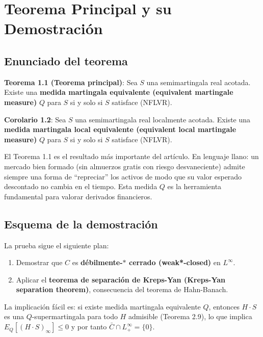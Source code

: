 \documentclass[12pt]{article}
\begin{document}
\section{Teorema Principal y su Demostraci\'on}

\subsection{Enunciado del teorema}

\textbf{Teorema 1.1 (Teorema principal)}: Sea $S$ una semimartingala real acotada. Existe una \textbf{medida martingala equivalente (equivalent martingale measure)} $Q$ para $S$ si y solo si $S$ satisface (NFLVR).

\textbf{Corolario 1.2}: Sea $S$ una semimartingala real localmente acotada. Existe una \textbf{medida martingala local equivalente (equivalent local martingale measure)} $Q$ para $S$ si y solo si $S$ satisface (NFLVR).

\begin{intuicion}
El Teorema 1.1 es el resultado m\'as importante del art\'iculo. En lenguaje llano: un mercado bien formado (sin almuerzos gratis con riesgo desvaneciente) admite siempre una forma de ``repreciar'' los activos de modo que su valor esperado descontado no cambia en el tiempo. Esta medida $Q$ es la herramienta fundamental para valorar derivados financieros.
\end{intuicion}

\subsection{Esquema de la demostraci\'on}

La prueba sigue el siguiente plan:
\begin{enumerate}
    \item Demostrar que $C$ es \textbf{d\'ebilmente-$*$ cerrado (weak*-closed)} en $L^\infty$.
    \item Aplicar el \textbf{teorema de separaci\'on de Kreps-Yan (Kreps-Yan separation theorem)}, consecuencia del teorema de Hahn-Banach.
\end{enumerate}

La implicaci\'on f\'acil es: si existe medida martingala equivalente $Q$, entonces $H \cdot S$ es una $Q$-supermartingala para todo $H$ admisible (Teorema 2.9), lo que implica $E_Q[(H \cdot S)_\infty] \leq 0$ y por tanto $\bar{C} \cap L^\infty_+ = \{0\}$.
\end{document}
